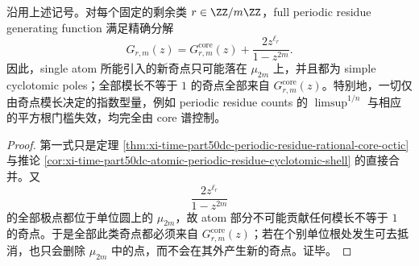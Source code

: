 \begin{corollary}\label{cor:xi-time-part50dc-full-periodic-residue-core-cyclotomic-splitting}
沿用上述记号。对每个固定的剩余类 \(r\in\ZZ/m\ZZ\)，full periodic residue generating function 满足精确分解
\[
\boxed{\;
G_{r,m}(z)
=
G_{r,m}^{\mathrm{core}}(z)+\frac{2z^{\ell_r}}{1-z^{2m}}.\;}
\]
因此，single atom 所能引入的新奇点只可能落在 \(\mu_{2m}\) 上，并且都为 simple cyclotomic poles；全部模长不等于 \(1\) 的奇点全部来自 \(G_{r,m}^{\mathrm{core}}(z)\)。特别地，一切仅由奇点模长决定的指数型量，例如 periodic residue counts 的 \(\limsup^{1/n}\) 与相应的平方根门槛失效，均完全由 core 谱控制。
\end{corollary}
\begin{proof}
第一式只是定理 \ref{thm:xi-time-part50dc-periodic-residue-rational-core-octic} 与推论 \ref{cor:xi-time-part50dc-atomic-periodic-residue-cyclotomic-shell} 的直接合并。又
\[
\frac{2z^{\ell_r}}{1-z^{2m}}
\]
的全部极点都位于单位圆上的 \(\mu_{2m}\)，故 atom 部分不可能贡献任何模长不等于 \(1\) 的奇点。于是全部此类奇点都必须来自 \(G_{r,m}^{\mathrm{core}}(z)\)；若在个别单位根处发生可去抵消，也只会删除 \(\mu_{2m}\) 中的点，而不会在其外产生新的奇点。证毕。
\end{proof}

